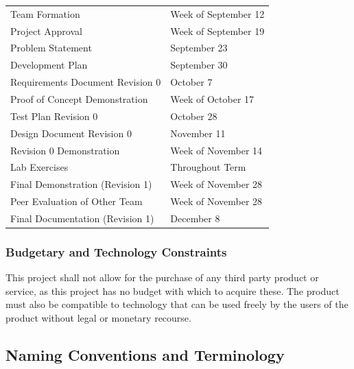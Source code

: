 \documentclass[12pt, titlepage]{article}
\begin{document}
\begin{tabular}{ p{6.7cm} l}

  Team Formation & Week of September 12\\

  Project Approval & Week of September 19\\

  Problem Statement & September 23\\

  Development Plan & September 30\\

  Requirements Document Revision 0 & October 7\\

  Proof of Concept Demonstration & Week of October 17\\

  Test Plan Revision 0 & October 28\\

  Design Document Revision 0 & November 11\\

  Revision 0 Demonstration & Week of November 14\\

  Lab Exercises & Throughout Term\\

  Final Demonstration (Revision 1) & Week of November 28\\

  Peer Evaluation of Other Team & Week of November 28\\

  Final Documentation (Revision 1) & December 8\\

\end{tabular}

\subsubsection{Budgetary and Technology Constraints}
This project shall not allow for the purchase of any third party product or service, as this project has no budget with which to acquire these. The product must also be compatible to technology that can be used freely by the users of the product without legal or monetary recourse.

\subsection{Naming Conventions and Terminology}
\end{document}
